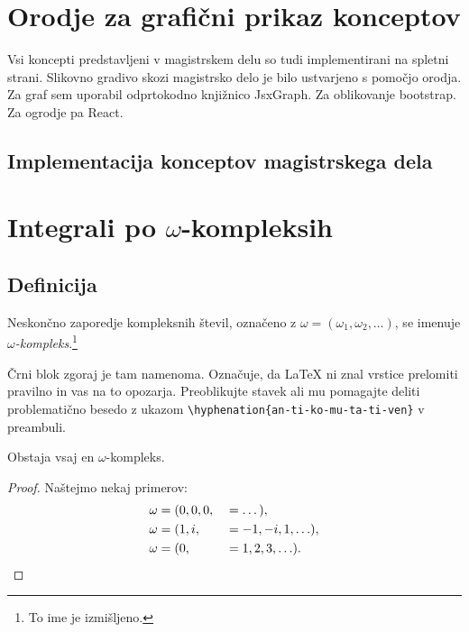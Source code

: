\documentclass[isrm2, tisk]{fmfdelo}
\begin{document}
    \section{Orodje za grafični prikaz konceptov}
    Vsi koncepti predstavljeni v magistrskem delu so tudi implementirani na spletni strani.
    Slikovno gradivo skozi magistrsko delo je bilo ustvarjeno s pomočjo orodja.
    Za graf sem uporabil odprtokodno knjižnico JsxGraph.
    Za oblikovanje bootstrap.
    Za ogrodje pa React.

    \subsection{Implementacija konceptov magistrskega dela}


    \newpage


    \section{Integrali po \texorpdfstring{$\omega$}{ω}-kompleksih}

    \subsection{Definicija}
    \begin{definicija}
        Neskončno zaporedje kompleksnih števil, označeno z $\omega = (\omega_1, \omega_2, \ldots)$,
        se imenuje \emph{$\omega$-kompleks}.\footnote{To ime je izmišljeno.}

        Črni blok zgoraj je tam namenoma. Označuje, da \LaTeX{} ni znal vrstice prelomiti pravilno
        in vas na to opozarja. Preoblikujte stavek ali mu pomagajte deliti problematično besedo z
        ukazom \verb|\hyphenation{an-ti-ko-mu-ta-ti-ven}| v preambuli.
    \end{definicija}
    \begin{trditev}
        \label{trd:obstoj-omega}
        Obstaja vsaj en $\omega$-kompleks.
    \end{trditev}
    \begin{proof}
        Naštejmo nekaj primerov:
        \begin{align}
            \omega &= (0, 0, 0,& &= \dots), \label{eq:zero-kompleks} \\
            \omega &= (1, i, & &=-1, -i, 1, \ldots), \nonumber \\
            \omega &= (0,& &= 1, 2, 3, \ldots). \nonumber \qedhere  %
        \end{align}
    \end{proof}
\end{document}
